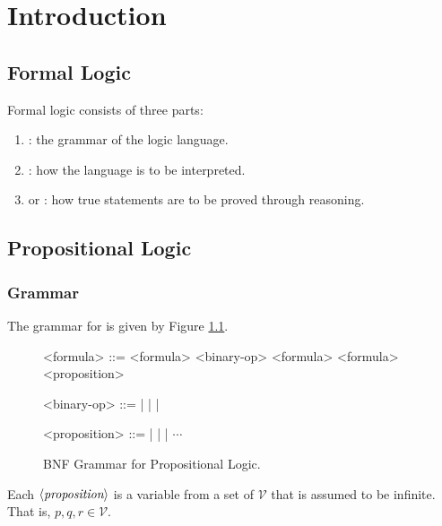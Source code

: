 \chapter{Introduction}

\section{Formal Logic}

Formal logic consists of three parts:

\begin{enumerate}
    \item {}: the grammar of the logic language.
    \item {}: how the language is to be interpreted.
    \item {} or : how true statements are
        to be proved through reasoning.
\end{enumerate}

\section{Propositional Logic}

\subsection{Grammar}

The grammar for  is given by Figure 
\ref{fig:propositional_logic_bnf}.

\begin{figure}[H]
    \centering
    \begin{grammar}
    <formula> ::= \lit{$($} <formula> <binary-op> <formula> \lit{$)$}
        \alt \lit{$\neg$} <formula>
        \alt <proposition>
    
    <binary-op> ::= \lit{$\land$} | \lit{$\lor$} | \lit{$\to$} | \lit{$\Iff$}
    
    <proposition> ::=  |  |  | $\cdots$
    \end{grammar}
    \caption{BNF Grammar for Propositional Logic.}
    \label{fig:propositional_logic_bnf}
\end{figure}

Each $\langle {\textit{proposition}} \rangle$ is a variable from a set of
 $\mathcal{V}$ that is assumed to be infinite. That is, 
$p, q, r \in \mathcal{V}$.

